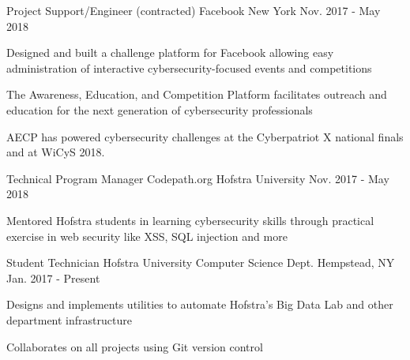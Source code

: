 

\begin{cventries}


\cventry
    {Project Support/Engineer (contracted) } %
    {Facebook} %
    {New York} %
    {Nov. 2017 - May 2018} %
    {
      \begin{cvitems} %
      \item {Designed and built a challenge platform for Facebook allowing easy administration of interactive cybersecurity-focused events and competitions}
      \item {The Awareness, Education, and Competition Platform facilitates outreach and education for the next generation of cybersecurity professionals}
      \item {AECP has powered cybersecurity challenges at the Cyberpatriot X national finals and at WiCyS 2018.}
      \end{cvitems}
    }

\cventry
    {Technical Program Manager} %
    {Codepath.org} %
    {Hofstra University} %
    {Nov. 2017 - May 2018} %
    {
      \begin{cvitems} %
        \item {Mentored Hofstra students in learning cybersecurity skills through practical exercise in web security like XSS, SQL injection and more}
      \end{cvitems}
    }

  \cventry
    {Student Technician} %
    {Hofstra University Computer Science Dept.} %
    {Hempstead, NY} %
    {Jan. 2017 - Present} %
    {
      \begin{cvitems} %
        \item {Designs and implements utilities to automate Hofstra's Big Data Lab and other department infrastructure}
        \item {Collaborates on all projects using Git version control}
      \end{cvitems}
    }

\end{cventries}
